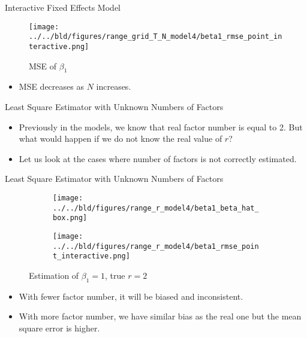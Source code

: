 \documentclass{beamer}
\begin{document}
\begin{frame}{Interactive Fixed Effects Model}

\begin{figure}

\texttt{[image: ../../bld/figures/range\_grid\_T\_N\_model4/beta1\_rmse\_point\_interactive.png]}
\centering
\caption{MSE of $\beta_1$}
\end{figure}

\begin{itemize}

    \item MSE decreases as $N$ increases.
\end{itemize}

\end{frame}

\begin{frame}{Least Square Estimator with Unknown Numbers of Factors}
\begin{itemize}
    \item Previously in the models, we know that real factor number is equal to 2. But what would happen if we do not know the real value of $r$?
    \item Let us look at the cases where number of factors is not correctly estimated.
\end{itemize}

\end{frame}

\begin{frame}{Least Square Estimator with Unknown Numbers of Factors}

\begin{figure}
\begin{subfigure}{.5\textwidth}
\centering
\texttt{[image: ../../bld/figures/range\_r\_model4/beta1\_beta\_hat\_box.png]}
\end{subfigure}%
\begin{subfigure}{.5\textwidth}
\centering
\texttt{[image: ../../bld/figures/range\_r\_model4/beta1\_rmse\_point\_interactive.png]}
\end{subfigure}%
\centering
\caption{Estimation of $\beta_1=1$, true $r=2$}
\end{figure}

\begin{itemize}
    \item With fewer factor number, it will be biased and inconsistent.
    \item With more factor number, we have similar bias as the real one but the mean square error is higher.
\end{itemize}

\end{frame}
\end{document}
